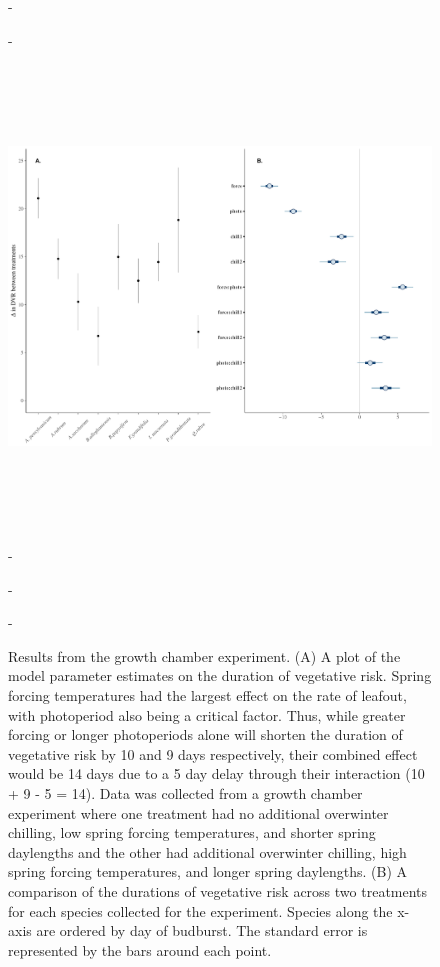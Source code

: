 \documentclass{article}\usepackage[]{graphicx}\usepackage[]{color}
\begin{document}
\begin{figure} [H] 
 -\begin{center}
 -\includegraphics[width=16cm, height=13cm]{..//figure/DVRdiff_twoplots.pdf} 
 -\caption{Results from the growth chamber experiment. (A) A plot of the model parameter estimates on the duration of vegetative risk. Spring forcing temperatures had the largest effect on the rate of leafout, with photoperiod also being a critical factor. Thus, while greater forcing or longer photoperiods alone will shorten the duration of vegetative risk by 10 and 9 days respectively, their combined effect would be 14 days due to a 5 day delay through their interaction (10 + 9 - 5 = 14). Data was collected from a growth chamber experiment where one treatment had no additional overwinter chilling, low spring forcing temperatures, and shorter spring daylengths and the other had additional overwinter chilling, high spring forcing temperatures, and longer spring daylengths. (B) A comparison of the durations of vegetative risk across two treatments for each species collected for the experiment. Species along the x-axis are ordered by day of budburst. The standard error is represented by the bars around each point. }\label{fig:dan} 
 -\end{center}
 -\end{figure}
 
\end{document}
